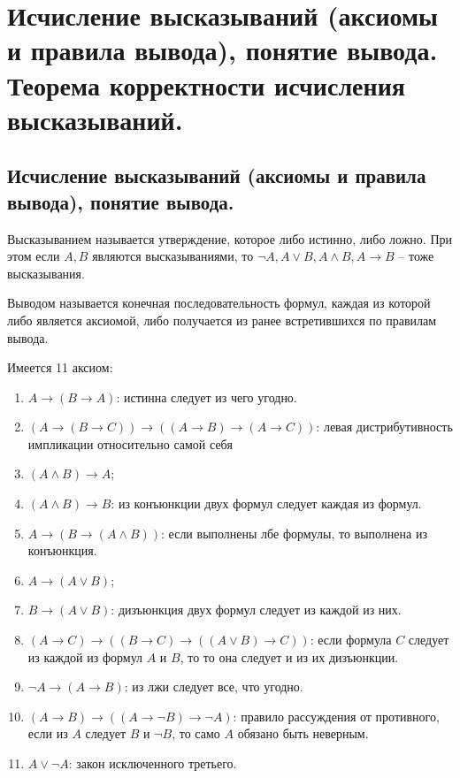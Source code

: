 \section{Исчисление высказываний (аксиомы и правила вывода), понятие вывода. Теорема корректности исчисления высказываний.}

\subsection{Исчисление высказываний (аксиомы и правила вывода), понятие вывода.}

\begin{definition}
  Высказыванием называется утверждение, которое либо истинно, либо ложно. При этом если $A,B$ являются высказываниями, то $\neg A, A \vee B, A \wedge B, A \to B$ -- тоже высказывания.
\end{definition}

\begin{definition}
  Выводом называется конечная последовательность формул, каждая из которой либо является аксиомой, либо получается из ранее встретившихся по правилам вывода.
\end{definition}

Имеется 11 аксиом:
\begin{enumerate}
  \item $A \to (B \to A)$: истинна следует из чего угодно.
  \item $(A \to (B \to C)) \to ((A \to B) \to (A \to C))$: левая дистрибутивность импликации относительно самой себя
  \item $(A \wedge B) \to A$;
  \item $(A \wedge B) \to B$: из конъюнкции двух формул следует каждая из формул.
  \item $A \to (B \to (A \wedge B))$: если выполнены лбе формулы, то выполнена из конъюнкция.
  \item $A \to (A \vee B)$;
  \item $B \to (A \vee B)$: дизъюнкция двух формул следует из каждой из них.
  \item $(A \to C) \to ((B \to C) \to ((A \vee B) \to C))$: если формула $C$ следует из каждой из формул $A$ и $B$, то то она следует и из их дизъюнкции.
  \item $\neg A \to (A \to B)$: из лжи следует все, что угодно.
  \item $(A \to B) \to ((A \to \neg B) \to \neg A)$: правило рассуждения от противного, если из $A$ следует $B$ и $\neg B$, то само $A$ обязано быть неверным.
  \item $A \vee \neg A$: закон исключенного третьего.
\end{enumerate}

